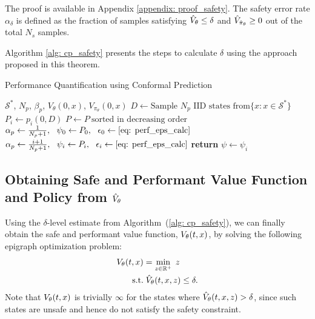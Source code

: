 
The proof is available in Appendix \ref{appendix: proof_safety}. 
The safety error rate $\alpha_{\delta}$ is defined as the fraction of samples satisfying $\hat{V}_{\theta} \leq \delta$ and $\hat{V}_{\hat{\pi}_{\theta}} \geq 0$ out of the total $N_s$ samples.

Algorithm \ref{alg: cp_safety} presents the steps to calculate $\delta$ using the approach proposed in this theorem. 
\begin{algorithm}[t]
\caption{Performance Quantification using Conformal Prediction}
\label{alg: cp_perf}
\begin{algorithmic}[1]
\REQUIRE $\mathcal{S}^*$, $N_p$, $\beta_p$, $V_{\theta}(0, x)$, $V_{\pi_{\theta}}(0, x)$
    \STATE $D \gets \text{Sample $N_p$ IID states from} \{x : x \in \mathcal{S}^*\}$
        \STATE $P_i \gets p_i(0, D)$
    \ENDFOR
\STATE $P \gets P~\text{sorted in decreasing order}$ 
\STATE $\alpha_{p} \gets \frac{1}{N_p + 1},~~\psi_0 \gets P_0, ~~\epsilon_0 \gets \eqref{eq: perf_eps_calc}$
   \STATE $\alpha_{p} \gets \frac{i+1}{N_p + 1},~~\psi_i \gets P_i,~~\epsilon_i \gets \eqref{eq: perf_eps_calc}$
    \ENDWHILE
    \ENDFOR
\STATE \textbf{return} $\psi \gets \psi_i$
\end{algorithmic}
\end{algorithm}
\vspace{-0.5em}
\subsection{Obtaining Safe and Performant Value Function and Policy from $\hat{V}_{\theta}$}
Using the $\delta$-level estimate from Algorithm~(\ref{alg: cp_safety}), we can finally obtain the safe and performant value function, $V_{\theta}(t, x)$, by solving the following epigraph optimization problem: 
\begin{equation}\label{eq: final_value_func}
    \begin{aligned}
        V_{\theta}(t, x) &= \min_{z \in \mathbb{R^+}} \; z \\
        \text{s.t.} & \; \hat{V}_{\theta}(t, x, z) \leq \delta.
    \end{aligned}
\end{equation}
Note that $V_{\theta}(t, x)$ is trivially $\infty$ for the states where $\hat{V}_{\theta}(t, x, z) > \delta$, since such states are unsafe and hence do not satisfy the safety constraint. 

